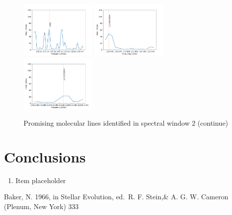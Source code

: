 \documentclass{aa}
\begin{document}
      \begin{figure}
\includegraphics[width=0.33\textwidth]{spw2_HDO}
\includegraphics[width=0.33\textwidth]{spw2_g-CH3CH2OH}
\includegraphics[width=0.33\textwidth]{spw2_t-CH3CH2OH}

    \caption{Promising molecular lines identified in spectral window 2 (continue)}
   \end{figure}




\section{Conclusions}

   \begin{enumerate}
   \item Item placeholder
   \end{enumerate}


%
%

\begin{thebibliography}{}

   Baker, N. 1966,
      in Stellar Evolution,
      ed.\ R. F. Stein,\& A. G. W. Cameron
      (Plenum, New York) 333
\end{thebibliography}
\end{document}
